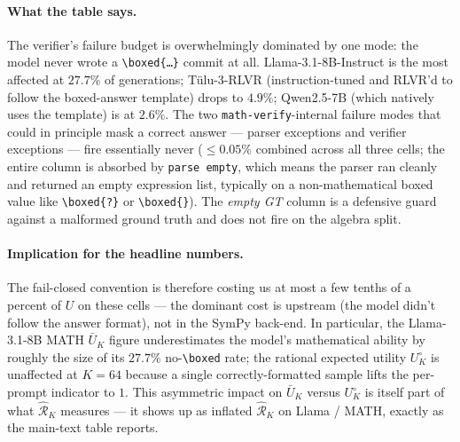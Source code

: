 \paragraph{What the table says.}
The verifier's failure budget is overwhelmingly dominated by one mode:
the model never wrote a \texttt{\textbackslash boxed\{\ldots\}} commit
at all. Llama-3.1-8B-Instruct is the most affected at $27.7\%$ of
generations; Tülu-3-RLVR (instruction-tuned and RLVR'd to follow the
boxed-answer template) drops to $4.9\%$; Qwen2.5-7B (which natively
uses the template) is at $2.6\%$. The two \texttt{math-verify}-internal
failure modes that could in principle mask a correct answer — parser
exceptions and verifier exceptions — fire essentially never
($\leq 0.05\%$ combined across all three cells; the entire column is
absorbed by \texttt{parse empty}, which means the parser ran cleanly
and returned an empty expression list, typically on a non-mathematical
boxed value like \texttt{\textbackslash boxed\{?\}} or
\texttt{\textbackslash boxed\{\}}). The \emph{empty GT} column is a
defensive guard against a malformed ground truth and does not fire on
the algebra split.

\paragraph{Implication for the headline numbers.}
The fail-closed convention is therefore costing us at most a few tenths
of a percent of $U$ on these cells — the dominant cost is upstream
(the model didn't follow the answer format), not in the SymPy
back-end. In particular, the Llama-3.1-8B MATH $\bar U_K$ figure
underestimates the model's mathematical ability by roughly the size of
its $27.7\%$ no-\texttt{\textbackslash boxed} rate; the rational
expected utility $U^\circ_K$ is unaffected at $K{=}64$ because a single
correctly-formatted sample lifts the per-prompt indicator to $1$. This
asymmetric impact on $\bar U_K$ versus $U^\circ_K$ is itself part of
what $\hat{\mathcal R}_K$ measures — it shows up as inflated $\hat{\mathcal R}_K$
on Llama / MATH, exactly as the main-text table reports.

